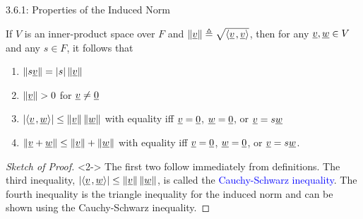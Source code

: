 \documentclass[10pt,letterpaper,english]{beamer}
\begin{document}
\begin{frame}{3.6.1: Properties of the Induced Norm}

\begin{theorem}
If $V$ is an inner-product space over $F$ and $\| \underline{v} \| \triangleq \sqrt{{\left\langle  \underline{v}  \mskip2mu ,  \underline{v}  \right\rangle}}$, then for any $\underline{v}, \underline{w} \in V$ and any $s\in F$, it follows that
\begin{enumerate}
\item $\left\| s \underline{v} \right\| = |s| \left\| \underline{v} \right\|$
\item $\left\| \underline{v} \right\| > 0$ for $\underline{v} \neq \underline{0}$
\item $\left| {\left\langle  \underline{v}  \mskip2mu ,  \underline{w}  \right\rangle} \right| \leq \left\| \underline{v} \right\| \left\| \underline{w} \right\|$ with equality iff $\underline{v} = \underline{0}$, $\underline{w}=\underline{0}$, or $\underline{v} = s \underline{w}$
\item $\left\| \underline{v} + \underline{w} \right\| \leq \left\| \underline{v} \right\| + \left\| \underline{w} \right\|$ with equality iff $\underline{v} = \underline{0}$, $\underline{w}=\underline{0}$, or $\underline{v} = s \underline{w}$.
\end{enumerate}
\end{theorem}

\begin{proof}[Sketch of Proof]<2->
The first two follow immediately from definitions.
The third inequality, $\left| {\left\langle  \underline{v}  \mskip2mu ,  \underline{w}  \right\rangle} \right| \leq \left\| \underline{v} \right\| \left\| \underline{w} \right\|$, is called the \textcolor{blue}{Cauchy-Schwarz inequality}.
The fourth inequality is the triangle inequality for the induced norm and can be shown using the Cauchy-Schwarz inequality.
\end{proof}


\end{frame}
\end{document}
